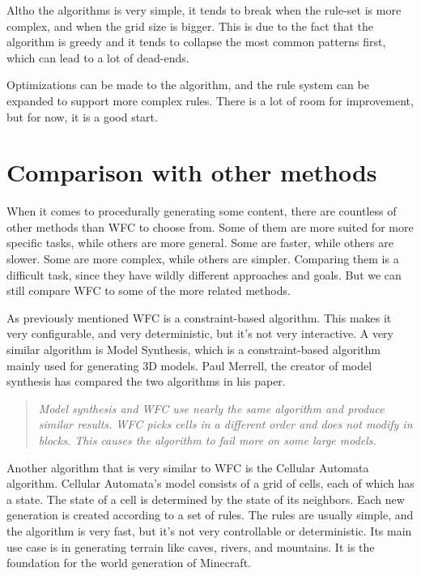 \documentclass[10pt,oneside,a4paper]{article}
\begin{document}
Altho the algorithms is very simple, it tends to break when the rule-set is more complex, and when the grid size is bigger.
This is due to the fact that the algorithm is greedy and it tends to collapse the most common patterns first, which can lead to a lot of dead-ends.

Optimizations can be made to the algorithm, and the rule system can be expanded to support more complex rules.
There is a lot of room for improvement, but for now, it is a good start.

\section{Comparison with other methods}\label{sec:comparison}
When it comes to procedurally generating some content, there are countless of other methods than WFC to choose from.
Some of them are more suited for more specific tasks, while others are more general.
Some are faster, while others are slower. Some are more complex, while others are simpler.
Comparing them is a difficult task, since they have wildly different approaches and goals.
But we can still compare WFC to some of the more related methods.

As previously mentioned WFC is a constraint-based algorithm. This makes it very configurable, and very deterministic, but it's not very interactive.
A very similar algorithm is Model Synthesis, which is a constraint-based algorithm mainly used for generating 3D models.
Paul Merrell, the creator of model synthesis has compared the two algorithms in his paper\cite{Mer21}.
\begin{quote}
    \textit{Model synthesis and WFC use nearly the same algorithm and produce similar results. WFC picks cells in a different
order and does not modify in blocks. This causes the algorithm to fail more on some large models.}
\end{quote}

Another algorithm that is very similar to WFC is the Cellular Automata algorithm.
Cellular Automata's model consists of a grid of cells, each of which has a state.
The state of a cell is determined by the state of its neighbors. Each new generation is created according to a set of rules.
The rules are usually simple, and the algorithm is very fast, but it's not very controllable or deterministic.
Its main use case is in generating terrain like caves, rivers, and mountains. It is the foundation for the world generation of Minecraft.
\end{document}
